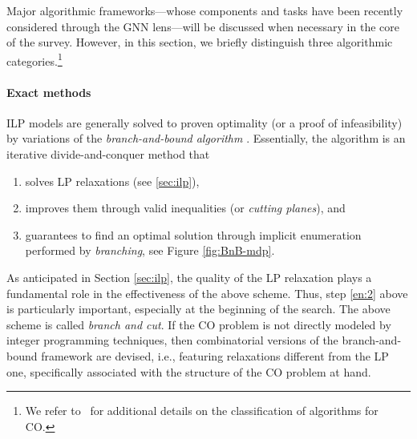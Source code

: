 \documentclass[twoside,11pt]{article}
\begin{document}
Major algorithmic frameworks---whose components and tasks have been recently considered through the GNN lens---will be discussed when necessary in the core of the survey. However, in this section, we briefly distinguish three algorithmic categories.\footnote{
We refer to~\cite{festa2014brief} for additional details on the classification of algorithms for CO.}

\paragraph{Exact methods} ILP models are generally solved to proven optimality (or a proof of infeasibility) by variations of the \emph{branch-and-bound algorithm} \citep{LD60, lodi2010mixed}. Essentially, the algorithm is an iterative divide-and-conquer method that
\begin{enumerate}
    \item solves LP relaxations (see \cref{sec:ilp}), 
    \item \label{en:2} improves them through valid inequalities (or \emph{cutting planes}), and 
    \item guarantees to find an optimal solution through implicit enumeration performed by \emph{branching}, see Figure \ref{fig:BnB-mdp}. 
\end{enumerate}
As anticipated in Section \ref{sec:ilp}, the quality of the LP relaxation plays a fundamental role in the effectiveness of the above scheme. Thus, step \ref{en:2} above is particularly important, especially at the beginning of the search. The above scheme is called \emph{branch and cut}.
If the CO problem is not directly modeled by integer programming techniques, then combinatorial versions of the branch-and-bound framework are devised, i.e., featuring relaxations different from the LP one, specifically associated with the structure of the CO problem at hand. 
\end{document}
